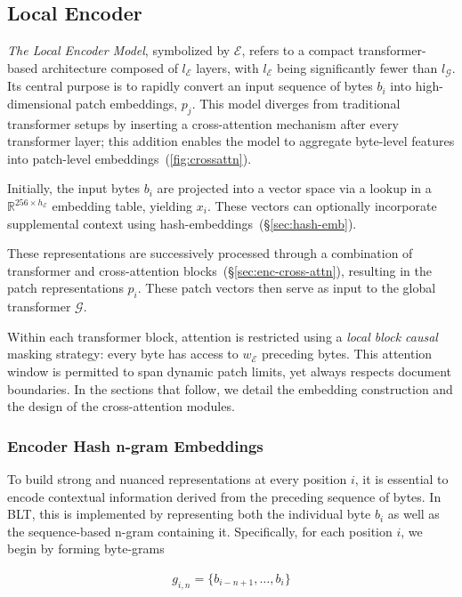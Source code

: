 \subsection{Local Encoder}
\label{section:local}

\textit{The Local Encoder Model}, symbolized by $\mathcal{E}$, refers to a compact transformer-based architecture composed of $l_{\mathcal{E}}$ layers, with $l_{\mathcal{E}}$ being significantly fewer than $l_{\mathcal{G}}$. Its central purpose is to rapidly convert an input sequence of bytes $b_i$ into high-dimensional patch embeddings, $p_j$. This model diverges from traditional transformer setups by inserting a cross-attention mechanism after every transformer layer; this addition enables the model to aggregate byte-level features into patch-level embeddings~(\autoref{fig:crossattn}).

Initially, the input bytes $b_i$ are projected into a vector space via a lookup in a $\mathbb{R}^{256 \times h_{\mathcal{E}}}$ embedding table, yielding $x_i$. These vectors can optionally incorporate supplemental context using hash-embeddings~(\S\ref{sec:hash-emb}).

These representations are successively processed through a combination of transformer and cross-attention blocks~(\S\ref{sec:enc-cross-attn}), resulting in the patch representations $p_i$. These patch vectors then serve as input to the global transformer $\mathcal{G}$.

Within each transformer block, attention is restricted using a \textit{local block causal} masking strategy: every byte has access to $w_{\mathcal{E}}$ preceding bytes. This attention window is permitted to span dynamic patch limits, yet always respects document boundaries. In the sections that follow, we detail the embedding construction and the design of the cross-attention modules.

\subsubsection{Encoder Hash n-gram Embeddings}
\label{sec:ngram-emb}
\label{sec:hash-emb}
To build strong and nuanced representations at every position $i$, it is essential to encode contextual information derived from the preceding sequence of bytes. In {\textsc BLT}, this is implemented by representing both the individual byte $b_i$ as well as the sequence-based n-gram containing it. Specifically, for each position $i$, we begin by forming byte-grams

\begin{align}
    g_{i,n}=\{b_{i-n + 1},\ldots, b_i\}
\end{align}


